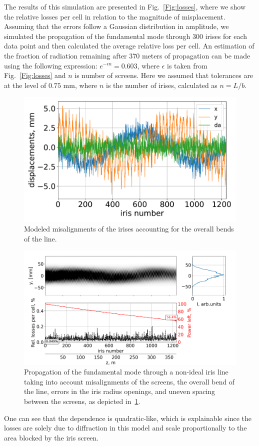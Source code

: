     The results of this simulation are presented in Fig.~\ref{Fig:losses}, where we show the relative losses per cell in relation to the magnitude of misplacement. Assuming that the errors follow a Gaussian distribution in amplitude, we simulated the propagation of the fundamental mode through 300 irises for each data point and then calculated the average relative loss per cell. An estimation of the fraction of radiation remaining after 370 meters of propagation can be made using the following expression: $e^{-\epsilon n} = 0.603$, where $\epsilon$ is taken from Fig.~\ref{Fig:losses} and $n$ is number of screens. Here we assumed that tolerances are at the level of $0.75$ mm, where $n$ is the number of irises, calculated as $n = L/b$.
    \begin{figure}[h!]
    	\centering
    		\includegraphics[trim={0 0cm 0 0cm}, width=0.65\linewidth]{content/images/transport/disp_plot.pdf}
    		\centering
            \captionsetup{justification=centering}
        	\caption{Modeled misalignments of the irises accounting for the overall bends of the line.}
        \label{Fig:disp_plot}
    \end{figure}
    \begin{figure}[h!]
    	\centering
    		\includegraphics[trim={0 0cm 0 0cm}, width=1.\linewidth]{content/images/transport/prop_misalighments.png}
    		\centering
            \captionsetup{justification=centering}
        	\caption{Propagation of the fundamental mode through a non-ideal iris line taking into account misalignments of the screens, the overall bend of the line, errors in the iris radius openings, and uneven spacing between the screens, as depicted in~\ref{Fig:disp_plot}.}
        \label{Fig:iris_mode}
    \end{figure}
    One can see that the dependence is quadratic-like, which is explainable since the losses are solely due to diffraction in this model and scale proportionally to the area blocked by the iris screen.
    
